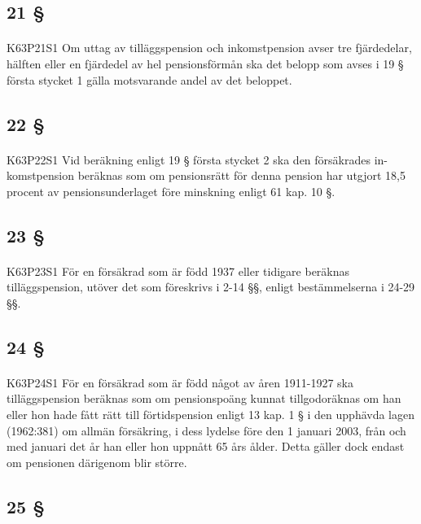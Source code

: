 \documentclass[a4paper,notitlepage,openany,10pt]{book}
\begin{document}
\subsection*{21 §}
\paragraph*{}
{\tiny K63P21S1}
Om uttag av tilläggspension och inkomstpension avser tre fjärdedelar, hälften eller en fjärdedel av hel pensionsförmån ska det belopp som avses i 19 § första stycket 1 gälla motsvarande andel av det beloppet.
\subsection*{22 §}
\paragraph*{}
{\tiny K63P22S1}
Vid beräkning enligt 19 § första stycket 2 ska den försäkrades in-komstpension beräknas som om pensionsrätt för denna pension har utgjort 18,5 procent av pensionsunderlaget före minskning enligt 61 kap. 10 §.
\subsection*{23 §}
\paragraph*{}
{\tiny K63P23S1}
För en försäkrad som är född 1937 eller tidigare beräknas tilläggspension, utöver det som föreskrivs i 2-14 §§, enligt bestämmelserna i 24-29 §§.
\subsection*{24 §}
\paragraph*{}
{\tiny K63P24S1}
För en försäkrad som är född något av åren 1911-1927 ska tilläggspension beräknas som om pensionspoäng kunnat tillgodoräknas om han eller hon hade fått rätt till förtidspension enligt 13 kap. 1 § i den upphävda lagen (1962:381) om allmän försäkring, i dess lydelse före den 1 januari 2003, från och med januari det år han eller hon uppnått 65 års ålder. Detta gäller dock endast om pensionen därigenom blir större.
\subsection*{25 §}
\end{document}
